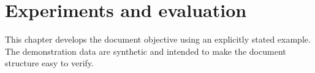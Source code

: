 \chapter{Experiments and evaluation}


\label{sec:chapter4}
This chapter develops the document objective using an explicitly stated example. The demonstration data are synthetic and intended to make the document structure easy to verify.

